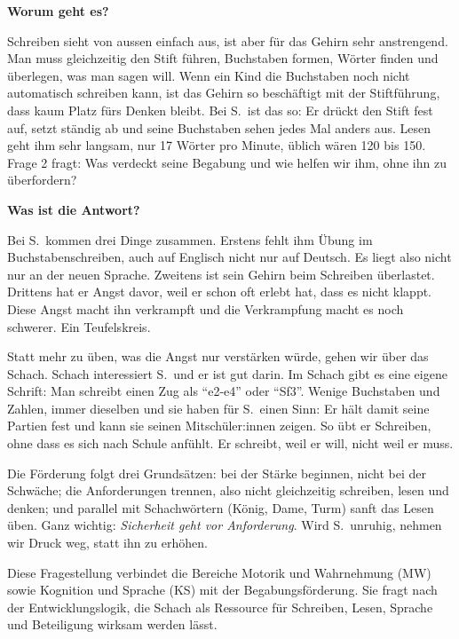 \documentclass[ngerman, a4paper]{article}
\begin{document}
\begin{frageantwort2}
\textbf{Worum geht es?}

Schreiben sieht von aussen einfach aus, ist aber für das Gehirn sehr
anstrengend. Man muss gleichzeitig den Stift führen, Buchstaben formen,
Wörter finden und überlegen, was man sagen will. Wenn ein Kind die
Buchstaben noch nicht automatisch schreiben kann, ist das Gehirn so
beschäftigt mit der Stiftführung, dass kaum Platz fürs Denken bleibt.
Bei S.~ist das so: Er drückt den Stift fest auf, setzt ständig ab und
seine Buchstaben sehen jedes Mal anders aus. Lesen geht ihm sehr langsam,
nur 17 Wörter pro Minute, üblich wären 120 bis 150. Frage 2 fragt: Was
verdeckt seine Begabung und wie helfen wir ihm, ohne ihn zu überfordern?

\medskip
\textbf{Was ist die Antwort?}

Bei S.~kommen drei Dinge zusammen. Erstens fehlt ihm Übung im
Buchstabenschreiben, auch auf Englisch nicht nur auf Deutsch. Es liegt
also nicht nur an der neuen Sprache. Zweitens ist sein Gehirn beim
Schreiben überlastet. Drittens hat er Angst davor, weil er schon oft
erlebt hat, dass es nicht klappt. Diese Angst macht ihn verkrampft und
die Verkrampfung macht es noch schwerer. Ein Teufelskreis.

Statt mehr zu üben, was die Angst nur verstärken würde, gehen wir über
das Schach. Schach interessiert S.~und er ist gut darin. Im Schach gibt
es eine eigene Schrift: Man schreibt einen Zug als \enquote{e2-e4} oder
\enquote{Sf3}. Wenige Buchstaben und Zahlen, immer dieselben und sie
haben für S.~einen Sinn: Er hält damit seine Partien fest und kann sie
seinen Mitschüler:innen zeigen. So übt er Schreiben, ohne dass es sich
nach Schule anfühlt. Er schreibt, weil er will, nicht weil er muss.

Die Förderung folgt drei Grundsätzen: bei der Stärke beginnen, nicht bei
der Schwäche; die Anforderungen trennen, also nicht gleichzeitig schreiben,
lesen und denken; und parallel mit Schachwörtern (König, Dame, Turm)
sanft das Lesen üben. Ganz wichtig: \emph{Sicherheit geht vor Anforderung}.
Wird S.~unruhig, nehmen wir Druck weg, statt ihn zu erhöhen.
\end{frageantwort2}

Diese Fragestellung verbindet die Bereiche Motorik und Wahrnehmung (MW) sowie
Kognition und Sprache (KS) mit der Begabungsförderung. Sie fragt nach der
Entwicklungslogik, die Schach als Ressource für Schreiben, Lesen, Sprache und
Beteiligung wirksam werden lässt.
 
\end{document}
